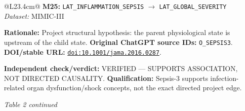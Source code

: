 \begin{tabular}{@{}L{23.4cm}@{}}
\addlinespace[2pt]
\midrule
\textbf{M25:} \nolinkurl{LAT_INFLAMMATION_SEPSIS} $\rightarrow$ \nolinkurl{LAT_GLOBAL_SEVERITY} \hfill \textit{Dataset:} MIMIC-III\par\textbf{Rationale:} Project structural hypothesis: the parent physiological state is upstream of the child state. \textbf{Original ChatGPT source IDs:} \nolinkurl{O_SEPSIS3}. \textbf{DOI/stable URL:} \href{https://doi.org/10.1001/jama.2016.0287}{\nolinkurl{doi:10.1001/jama.2016.0287}}.\par\textbf{Independent check/verdict:} VERIFIED --- SUPPORTS ASSOCIATION, NOT DIRECTED CAUSALITY. \textbf{Qualification:} Sepsis-3 supports infection-related organ dysfunction/shock concepts, not the exact directed project edge. \\
\addlinespace[2pt]
\midrule
\bottomrule
\end{tabular}
\clearpage
\textit{Table 2 continued}\par
